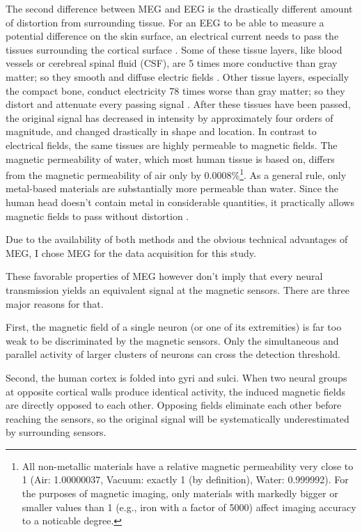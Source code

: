 The second difference between MEG and EEG is the drastically different amount of distortion from surrounding tissue.
For an EEG to be able to measure a potential difference on the skin surface, an electrical current needs to pass the tissues surrounding the cortical surface \cite{1.5.tissues.b}.
Some of these tissue layers, like blood vessels or cerebreal spinal fluid (CSF), are 5 times more conductive than gray matter; so they smooth and diffuse electric fields \cite{1.5.tissues.a}\cite{1.5.tissues.b}.
Other tissue layers, especially the compact bone, conduct electricity 78 times worse than gray matter; so they distort and attenuate every passing signal \cite{1.5.tissues.a}.
After these tissues have been passed, the original signal has decreased in intensity by approximately four orders of magnitude, and changed drastically in shape and location.
In contrast to electrical fields, the same tissues are highly permeable to magnetic fields.
The magnetic permeability of water, which most human tissue is based on, differs from the magnetic permeability of air only by 0.0008\%\footnote{All non-metallic materials have a relative magnetic permeability very close to 1 (Air: 1.00000037, Vacuum: exactly 1 (by definition), Water: 0.999992). For the purposes of magnetic imaging, only materials with markedly bigger or smaller values than 1 (e.g., iron with a factor of 5000) affect imaging accuracy to a noticable degree.}\cite{1.5.magneticProperties}.
As a general rule, only metal-based materials are substantially more permeable than water.
Since the human head doesn't contain metal in considerable quantities, it practically allows magnetic fields to pass without distortion \cite{1.5.tissues.a}.

Due to the availability of both methods and the obvious technical advantages of MEG, I chose MEG for the data acquisition for this study.


These favorable properties of MEG however don't imply that every neural transmission yields an equivalent signal at the magnetic sensors.
There are three major reasons for that.

First, the magnetic field of a single neuron (or one of its extremities) is far too weak to be discriminated by the magnetic sensors.
Only the simultaneous and parallel activity of larger clusters of neurons can cross the detection threshold.

Second, the human cortex is folded into gyri and sulci.
When two neural groups at opposite cortical walls produce identical activity, the induced magnetic fields are directly opposed to each other.
Opposing fields eliminate each other before reaching the sensors, so the original signal will be systematically underestimated by surrounding sensors.

